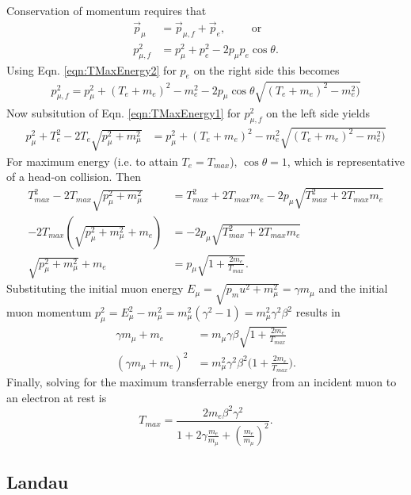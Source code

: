 Conservation of momentum requires that
\begin{align*}
\vec{p}_\mu&=\vec{p}_{\mu,f}+\vec{p}_e, \qquad\text{ or}\\
 p_{\mu,f}^2&=p_\mu ^2 + p_e^2-2p_\mu p_e \cos\theta.
\end{align*}
Using Eqn. \ref{eqn:TMaxEnergy2} for $p_e$ on the right side this becomes
\begin{align*}
p_{\mu,f}^2=p_\mu ^2+(T_e+m_e)^2-m_e ^2-2p_\mu\cos\theta \sqrt{(T_e+m_e)^2-m_e^2)}
\end{align*}
Now subsitution of Eqn. \ref{eqn:TMaxEnergy1} for $p_{\mu,f} ^2$ on the left side yields
\begin{align*}
p_\mu ^2+T_e ^2 - 2T_e \sqrt{p_\mu^2+m_\mu ^2}&=p_\mu ^2+(T_e+m_e)^2-m_e ^2 \sqrt{(T_e+m_e)^2-m_e^2)}
\end{align*}
For maximum energy (i.e. to attain $T_e=T_{max}$), $\cos\theta=1$, which is representative of a head-on collision. Then
\begin{align*}
T_{max} ^2-2T_{max}\sqrt{p_\mu ^2+m_\mu ^2} &=T_{max}^2+2T_{max}m_e-2p_\mu\sqrt{T_{max}^2+2T_{max}m_e}\\
-2T_{max}(\sqrt{p_\mu ^2 + m_\mu ^2}+m_e)&=-2p_\mu\sqrt{T_{max}^2+2T_{max}m_e}\\
\sqrt{p_\mu ^2+m_\mu ^2}+m_e&=p_\mu\sqrt{1+\frac{2m_e}{T_{max}}}.
\end{align*}
Substituting the initial muon energy $E_\mu=\sqrt{p_mu ^2+m_\mu ^2}=\gamma m_\mu$ and the initial muon momentum $p_\mu ^2=E_\mu ^2 - m_\mu ^2 = m_\mu ^2 (\gamma^2-1)=m_\mu ^2 \gamma^2 \beta^2$ results in
\begin{align*}
\gamma m_\mu + m_e &= m_\mu\gamma\beta\sqrt{1+\frac{2m_e}{T_{max}}}\\
(\gamma m_\mu +m_e)^2 &=m_\mu^2\gamma^2\beta^2 \Big(1+\frac{2m_e}{T_{max}}\Big).
\end{align*}
Finally, solving for the maximum transferrable energy from an incident muon to an electron at rest is
\begin{equation}\label{eqn:tmax}
T_{max}=\frac{2m_e \beta^2 \gamma^2}{1+2\gamma\frac{m_e}{m_\mu}+(\frac{m_e}{m_\mu})^2}.
\end{equation}

\subsection{Landau}\label{ssc:ICOOLStragglingLandau}

